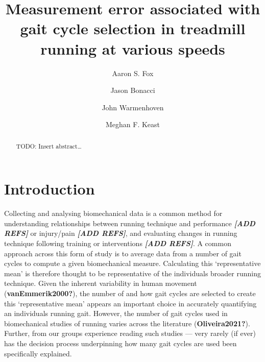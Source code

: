 \documentclass[]{elsarticle} %
\begin{document}
\begin{frontmatter}

  \title{Measurement error associated with gait cycle selection in
treadmill running at various speeds}
    \author[Centre for Sport Research]{Aaron S. Fox}
  
    \author[Centre for Sport Research]{Jason Bonacci}
  
    \author[UNSW]{John Warmenhoven}
  
    \author[Centre for Sport Research]{Meghan F. Keast}
  
      \address[Centre for Sport Research]{Centre for Sport Research,
School of Exercise and Nutrition Sciences, Deakin University, Geelong,
Australia}
    \address[UNSW]{School of Engineering and Information Technology,
University of New South Wales, Canberra, Australia}
  
  \begin{abstract}
  TODO: Insert abstract\ldots{}
  \end{abstract}
  
 \end{frontmatter}

\hypertarget{introduction}{%
\section{Introduction}\label{introduction}}

Collecting and analysing biomechanical data is a common method for
understanding relationships between running technique and performance
\textbf{\emph{{[}ADD REFS{]}}} or injury/pain \textbf{\emph{{[}ADD
REFS{]}}}, and evaluating changes in running technique following
training or interventions \textbf{\emph{{[}ADD REFS{]}}}. A common
approach across this form of study is to average data from a number of
gait cycles to compute a given biomechanical measure. Calculating this
`representative mean' is therefore thought to be representative of the
individuals broader running technique. Given the inherent variability in
human movement (\textbf{vanEmmerik2000?}), the number of and how gait
cycles are selected to create this `representative mean' appears an
important choice in accurately quantifying an individuals running gait.
However, the number of gait cycles used in biomechanical studies of
running varies across the literature (\textbf{Oliveira2021?}). Further,
from our groups experience reading such studies --- very rarely (if
ever) has the decision process underpinning how many gait cycles are
used been specifically explained.
\end{document}
